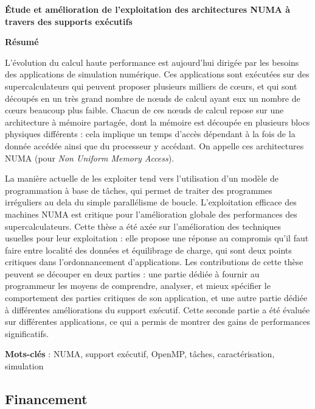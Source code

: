 \MakeUGthesePDG

\clearpage
\hbox{}\newpage

\begin{center}\textbf{\large Étude et amélioration de l'exploitation des architectures NUMA à travers des supports exécutifs}

\quad

\textbf{Résumé}
\end{center}

L'évolution du calcul haute performance est aujourd'hui dirigée par les besoins des applications de simulation numérique.
Ces applications sont exécutées sur des supercalculateurs qui peuvent proposer plusieurs milliers de cœurs, et qui sont découpés en un très grand nombre de nœuds de calcul ayant eux un nombre de cœurs beaucoup plus faible.
Chacun de ces nœuds de calcul repose sur une architecture à mémoire partagée, dont la mémoire est découpée en plusieurs blocs physiques différents : cela implique un temps d'accès dépendant à la fois de la donnée accédée ainsi que du processeur y accédant.
On appelle ces architectures NUMA (pour \emph{Non Uniform Memory Access}).

La manière actuelle de les exploiter tend vers l'utilisation d'un modèle de programmation à base de tâches, qui permet de traiter des programmes irréguliers au dela du simple parallélisme de boucle.
L'exploitation efficace des machines NUMA est critique pour l'amélioration globale des performances des supercalculateurs.
Cette thèse a été axée sur l'amélioration des techniques usuelles pour leur exploitation : elle propose une réponse au compromis qu'il faut faire entre localité des données et équilibrage de charge, qui sont deux points critiques dans l'ordonnancement d'applications.
Les contributions de cette thèse peuvent se découper en deux parties : une partie dédiée à fournir au programmeur les moyens de comprendre, analyser, et mieux spécifier le comportement des parties critiques de son application, et une autre partie dédiée à différentes améliorations du support exécutif.
Cette seconde partie a été évaluée sur différentes applications, ce qui a permis de montrer des gains de performances significatifs.



\quad

\textbf{Mots-clés} : NUMA, support exécutif, OpenMP, tâches, caractérisation, simulation

\subsection*{Financement}

